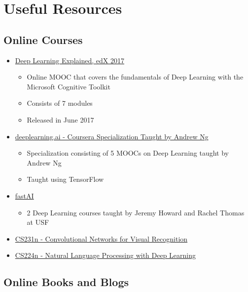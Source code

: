 \documentclass[]{book}
\providecommand{\tightlist}{%
  \setlength{\itemsep}{0pt}\setlength{\parskip}{0pt}}
\theoremstyle{definition}
\theoremstyle{definition}
\theoremstyle{definition}
\theoremstyle{remark}
\begin{document}
\section{Useful Resources}\label{useful-resources}

\subsection{Online Courses}\label{online-courses}

\begin{itemize}
\tightlist
\item
  \href{https://courses.edx.org/courses/course-v1:Microsoft+DAT236x+2T2017/course/}{Deep
  Learning Explained, edX 2017}

  \begin{itemize}
  \tightlist
  \item
    Online MOOC that covers the fundamentals of Deep Learning with the
    Microsoft Cognitive Toolkit
  \item
    Consists of 7 modules
  \item
    Released in June 2017
  \end{itemize}
\item
  \href{https://www.deeplearning.ai/}{deeplearning.ai - Coursera
  Specialization Taught by Andrew Ng}

  \begin{itemize}
  \tightlist
  \item
    Specialization consisting of 5 MOOCs on Deep Learning taught by
    Andrew Ng
  \item
    Taught using TensorFlow
  \end{itemize}
\item
  \href{http://www.fast.ai/}{fastAI}

  \begin{itemize}
  \tightlist
  \item
    2 Deep Learning courses taught by Jeremy Howard and Rachel Thomas at
    USF
  \end{itemize}
\item
  \href{http://cs231n.stanford.edu/}{CS231n - Convolutional Networks for
  Visual Recognition}
\item
  \href{http://web.stanford.edu/class/cs224n/}{CS224n - Natural Language
  Processing with Deep Learning}
\end{itemize}

\subsection{Online Books and Blogs}\label{online-books-and-blogs}
\end{document}
